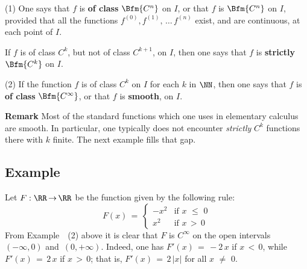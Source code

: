         (1) One says that $f$ is {\bf of class} $\Bfm{C^{n}}$ on $I$, or that $f$ is $\Bfm{C^{n}}$ on $I$,
    provided that all the functions $f^{(0)}, f^{(1)},\,{\ldots}\,f^{(n)}$ exist, and are continuous, at each point of $I$.

        If $f$ is of class $C^{k}$, but not of class $C^{k+1}$, on $I$, then one says that $f$ is {\bf strictly} $\Bfm{C^{k}}$ on $I$.

\V

        (2) If the function $f$ is of class $C^{k}$ on $I$ for each $k$ in ${\NN}$,
    then one says that $f$ is {\bf of class} $\Bfm{C^{{\infty}}}$, or that $f$ is {\bf smooth}, on $I$.

\VV

        {\bf Remark} Most of the standard functions which one uses in elementary calculus are smooth.
    In particular, one typically does not encounter {\em strictly} $C^{k}$ functions there with $k$ finite. The next example fills that gap.

\VV

            \subsection{\small{\bf Example}}
            \label{ExampE20.85}

\V

        Let $F:{\RR} \,{\rightarrow}\, {\RR}$ be the function given by the following rule:
        \begin{displaymath}
        F(x) \,=\, \left\{
        \begin{array}{rl}
        -x^{2} & \mbox{if $x\,\,{\leq}\,\,0$} \\
        x^{2} & \mbox{if $x\,>\,0$}
        \end{array}
                            \right.
        \end{displaymath}
    From Example~~(2) above it is clear that $F$ is $C^{{\infty}}$ on the open intervals $(-{\infty},0)$ and~$(0,+{\infty})$.
    Indeed, one has $F'(x) \,=\, -2\,x$ if $x\,<\,0$, while $F'(x) \,=\, 2\,x$ if $x\,>\,0$; that is, $F'(x) \,=\, 2\,|x|$ for all $x \,\,{\neq}\,\, 0$.

